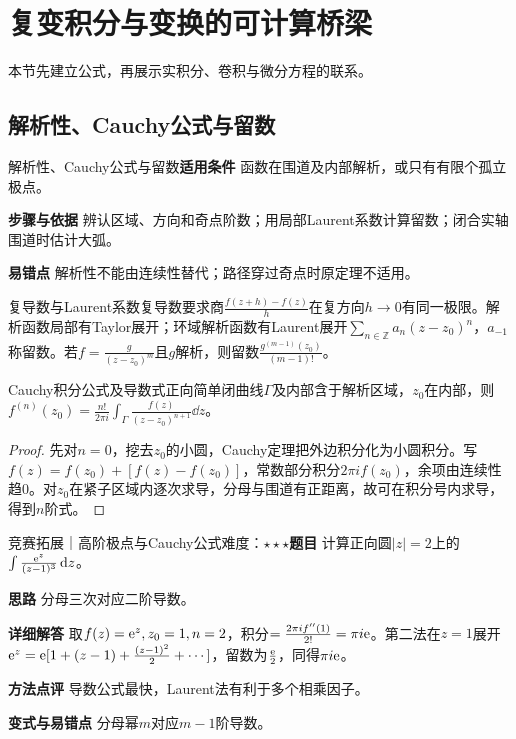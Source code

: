 \section{复变积分与变换的可计算桥梁}\label{deep:integral_complex_deep}

\begin{examtip}本节先建立公式，再展示实积分、卷积与微分方程的联系。\end{examtip}

\subsection{解析性、Cauchy公式与留数}\label{deep:integral_complex_deep:complex}

\begin{method}{解析性、Cauchy公式与留数}\textbf{适用条件} 函数在围道及内部解析，或只有有限个孤立极点。\par\textbf{步骤与依据} 辨认区域、方向和奇点阶数；用局部Laurent系数计算留数；闭合实轴围道时估计大弧。\par\textbf{易错点} 解析性不能由连续性替代；路径穿过奇点时原定理不适用。\end{method}

\begin{definition}{复导数与Laurent系数}复导数要求商$\frac{f(z+h)-f(z)}{h}$在复方向$h\to0$有同一极限。解析函数局部有Taylor展开；环域解析函数有Laurent展开$\sum_{n\in\mathbb Z}a_n(z-z_0)^n$，$a_{-1}$称留数。若$f=\frac{g}{(z-z_0)^m}$且$g$解析，则留数$\frac{g^{(m-1)}(z_0)}{(m-1)!}$。\end{definition}

\begin{theorem}{Cauchy积分公式及导数式}正向简单闭曲线$\Gamma$及内部含于解析区域，$z_0$在内部，则$f^{(n)}(z_0)=\frac{n!}{2\pi i}\int_\Gamma \frac{f(z)}{(z-z_0)^{n+1}}\dd z$。\end{theorem}\begin{proof}先对$n=0$，挖去$z_0$的小圆，Cauchy定理把外边积分化为小圆积分。写$f(z)=f(z_0)+[f(z)-f(z_0)]$，常数部分积分$2\pi if(z_0)$，余项由连续性趋0。对$z_0$在紧子区域内逐次求导，分母与围道有正距离，故可在积分号内求导，得到$n$阶式。\end{proof}

\begin{example}{竞赛拓展｜高阶极点与Cauchy公式}{难度：$\star\star\star$}\label{deep:ex:integral_complex_deep:cauchy}\textbf{题目} 计算正向圆$|z|=2$上的$\int\frac{\mathrm{e}^z}{(z-1)^3}\mathop{}\!\mathrm{d} z$。\par\textbf{思路} 分母三次对应二阶导数。\par\textbf{详细解答} 取$f(z)=\mathrm{e}^z,z_0=1,n=2$，积分$=\frac{2\pi i f''(1)}{2!}=\pi i\mathrm{e}$。第二法在$z=1$展开$\mathrm{e}^z=\mathrm{e}[1+(z-1)+\frac{(z-1)^2}{2}+\cdots]$，留数为$\frac{\mathrm{e}}{2}$，同得$\pi i\mathrm{e}$。\par\textbf{方法点评} 导数公式最快，Laurent法有利于多个相乘因子。\par\textbf{变式与易错点} 分母幂$m$对应$m-1$阶导数。\end{example}

